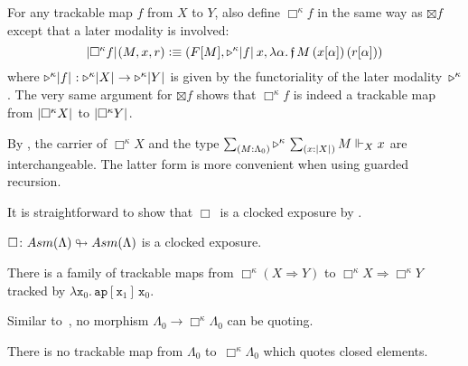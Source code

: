 \documentclass[a4paper,UKenglish,numberwithinsect,cleveref,thm-restate]{lipics-v2021}
\numberwithin{equation}{section}
\theoremstyle{definition}
\theoremstyle{plain}
\newtheorem*{notation*}{Notation}
\begin{document}

For any trackable map $f$ from $X$ to $Y$, also define $\Box^\kappa f$ in the same way as $\boxtimes f$ except that a later modality is involved: 
\[
  \mathopen{}\left|\Box^\kappa f\right|_{}^{}\mathclose{}(M, x, r) \vcentcolon\equiv (F[M], \mathord{\triangleright}^\kappa \mathopen{}\left|f\right|_{}^{}\mathclose{}\, x, \lambda \alpha.\, \mathfrak{f}\,M\,(x[\alpha])\,(r[\alpha]))
\]
where $\mathord{\triangleright}^\kappa \mathopen{}\left|f\right|_{}^{}\mathclose{} : \mathord{\triangleright}^\kappa \mathopen{}\left|X\right|_{}^{}\mathclose{} \to \mathord{\triangleright}^\kappa \mathopen{}\left|Y\right|_{}^{}\mathclose{}$ is given by the functoriality of the later modality~$\mathord{\mathord{\triangleright}}^\kappa$.
The very same argument for $\boxtimes f$ shows that $\Box^\kappa f$ is indeed a trackable map from $\mathopen{}\left|\Box^\kappa X\right|_{}^{}\mathclose{}$ to $\mathopen{}\left|\Box^\kappa Y\right|_{}^{}\mathclose{}$.

\begin{remark*}
  By , the carrier of $\Box^\kappa X$ and the type $\sm{M : \Lambda_0}\laterp^\kappa\, \sm{x : \bproj{X}} M \Vdash_X x$ are interchangeable.
  The latter form is more convenient when using guarded recursion.
\end{remark*}

It is straightforward to show that $\Box$~is a clocked exposure by .
\begin{theorem}\label{thm:GL-exposure}
  $\Box \colon \Asm(\Lambda) \looparrowright \Asm(\Lambda)$ is a clocked exposure.
\end{theorem}

\begin{proposition}
There is a family of trackable maps
from $\Box^\kappa (X \Rightarrow Y)$ to $\Box^\kappa X \Rightarrow \Box^\kappa Y$  tracked by $\lambda \mathtt{x}_0.\, \mathtt{ap}[\mathtt{x}_1] \, \mathtt{x}_0$.
\end{proposition}

Similar to~, no morphism $\Lambda_0 \to \Box^\kappa \Lambda_0$ can be quoting.
\begin{theorem}\label{thm:GL-no-quoting}
  There is no trackable map from $\Lambda_0$ to~$\Box^\kappa \Lambda_0$ which quotes closed elements.
\end{theorem}
\end{document}
